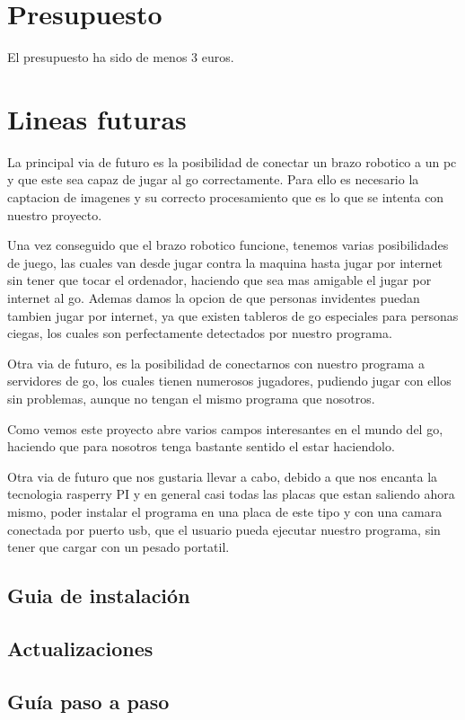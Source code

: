 \documentclass[12pt,a4paper]{report}
\begin{document}
\chapter{Presupuesto} El presupuesto ha sido de menos 3 euros.

\chapter{Lineas futuras}


La principal via de futuro es la posibilidad de conectar un brazo robotico a un
pc y que este sea capaz de jugar al go correctamente. Para ello es necesario la
captacion de imagenes y su correcto procesamiento que es lo que se intenta con
nuestro proyecto. 

Una vez conseguido que el brazo robotico funcione, tenemos varias posibilidades
de juego, las cuales van desde jugar contra la maquina hasta jugar por internet
sin tener que tocar el ordenador, haciendo que sea mas amigable el jugar por
internet al go. Ademas damos la opcion de que personas invidentes puedan tambien
jugar por internet, ya que existen tableros de go especiales para personas
ciegas, los cuales son perfectamente detectados por nuestro programa.

Otra via de futuro, es la posibilidad de conectarnos con nuestro programa a
servidores de go, los cuales tienen numerosos jugadores, pudiendo jugar con
ellos sin problemas, aunque no tengan el mismo programa que nosotros.

Como vemos este proyecto abre varios campos interesantes en el mundo del go,
haciendo que para nosotros tenga bastante sentido el estar haciendolo. 

Otra via de futuro que nos gustaria llevar a cabo, debido a que nos encanta la
tecnologia rasperry PI y en general casi todas las placas que estan saliendo
ahora mismo, poder instalar el programa en una placa de este tipo y con una
camara conectada por puerto usb, que el usuario pueda ejecutar nuestro programa,
sin tener que cargar con un pesado portatil. 

\section{Guia de instalación} \section{Actualizaciones} \section{Guía paso a
paso}
\end{document}
